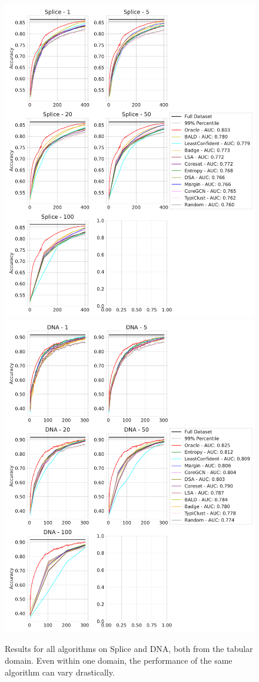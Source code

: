 \documentclass[]{article}
\begin{document}
\begin{figure}
	\centering
	\includegraphics[width=0.49\linewidth]{img/eval_splice}
	\hspace{1mm}
	\includegraphics[width=0.49\linewidth]{img/eval_dna}
	\caption{Results for all algorithms on Splice and DNA, both from the tabular domain. Even within one domain, the performance of the same algorithm can vary drastically.}
	\label{fig:eval_vector}
\end{figure}
%
\end{document}
